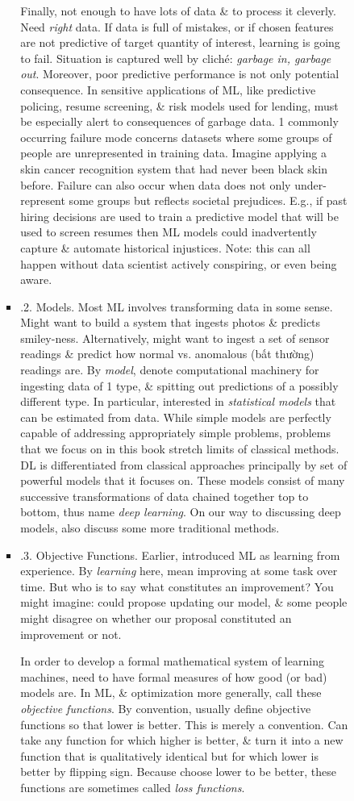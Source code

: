 \documentclass{article}
\begin{document}
\begin{enumerate}
\begin{itemize}
\begin{itemize}
\begin{itemize}
				Finally, not enough to have lots of data \& to process it cleverly. Need {\it right} data. If data is full of mistakes, or if chosen features are not predictive of target quantity of interest, learning is going to fail. Situation is captured well by clich\'e: {\it garbage in, garbage out}. Moreover, poor predictive performance is not only potential consequence. In sensitive applications of ML, like predictive policing, resume screening, \& risk models used for lending, must be especially alert to consequences of garbage data. 1 commonly occurring failure mode concerns datasets where some groups of people are unrepresented in training data. Imagine applying a skin cancer recognition system that had never been black skin before. Failure can also occur when data does not only under-represent some groups but reflects societal prejudices. E.g., if past hiring decisions are used to train a predictive model that will be used to screen resumes then ML models could inadvertently capture \& automate historical injustices. Note: this can all happen without data scientist actively conspiring, or even being aware.
				\item {.2. Models.} Most ML involves transforming data in some sense. Might want to build a system that ingests photos \& predicts smiley-ness. Alternatively, might want to ingest a set of sensor readings \& predict how normal vs. anomalous (bất thường) readings are. By {\it model}, denote computational machinery for ingesting data of 1 type, \& spitting out predictions of a possibly different type. In particular, interested in {\it statistical models} that can be estimated from data. While simple models are perfectly capable of addressing appropriately simple problems, problems that we focus on in this book stretch limits of classical methods. DL is differentiated from classical approaches principally by set of powerful models that it focuses on. These models consist of many successive transformations of data chained together top to bottom, thus name {\it deep learning}. On our way to discussing deep models, also discuss some more traditional methods.
				\item {.3. Objective Functions.} Earlier, introduced ML as learning from experience. By {\it learning} here, mean improving at some task over time. But who is to say what constitutes an improvement? You might imagine: could propose updating our model, \& some people might disagree on whether our proposal constituted an improvement or not.
				
				In order to develop a formal mathematical system of learning machines, need to have formal measures of how good (or bad) models are. In ML, \& optimization more generally, call these {\it objective functions}. By convention, usually define objective functions so that lower is better. This is merely a convention. Can take any function for which higher is better, \& turn it into a new function that is qualitatively identical but for which lower is better by flipping sign. Because choose lower to be better, these functions are sometimes called {\it loss functions}.
				

\end{itemize}
\end{itemize}
\end{itemize}
\end{enumerate}
\end{document}
